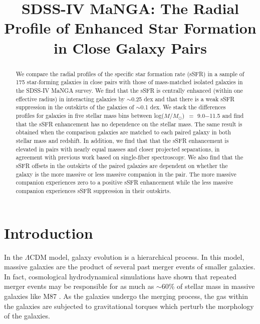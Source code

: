 \documentclass[iop,revtex4,twocolumn,apj,numberedappendix,appendixfloats]{emulateapj}
\newcommand{\logm}{log($M/M_{\odot}$)}
\begin{document}
\title{
SDSS-IV MaNGA: The Radial Profile of Enhanced Star Formation in Close Galaxy Pairs
}



\begin{abstract}
We compare the radial profiles of the specific star formation rate (sSFR) in a sample of 175 star-forming galaxies in close pairs with those of mass-matched isolated galaxies in the SDSS-IV MaNGA survey. We find that the sSFR is centrally enhanced (within one effective radius) in interacting galaxies by $\sim$0.25 dex and that there is a weak sSFR suppression in the outskirts of the galaxies of $\sim$0.1 dex. We stack the differences profiles for galaxies in five stellar mass bins between \logm\ $=$ 9.0$-$11.5 and find that the sSFR enhancement has no dependence on the stellar mass. The same result is obtained when the comparison galaxies are matched to each paired galaxy in both stellar mass and redshift. In addition, we find that that the sSFR enhancement is elevated in pairs with nearly equal masses and closer projected separations, in agreement with previous work based on single-fiber spectroscopy. We also find that the sSFR offsets in the outskirts of the paired galaxies are dependent on whether the galaxy is the more massive or less massive companion in the pair. The more massive companion experiences zero to a positive sSFR enhancement while the less massive companion experiences sSFR suppression in their outskirts.
\end{abstract}


\section{Introduction}\label{sec:intro}

In the $\Lambda$CDM model, galaxy evolution is a hierarchical process. In this model, massive galaxies are the product of several past merger events of smaller galaxies. In fact, cosmological hydrodynamical simulations have shown that repeated merger events may be responsible for as much as $\sim$60\% of stellar mass in massive galaxies like M87 \citep[e.g.,][]{Rodriguez-Gomez:2016,Pillepich:2018}. As the galaxies undergo the merging process, the gas within the galaxies are subjected to gravitational torques which perturb the morphology of the galaxies.
\end{document}
